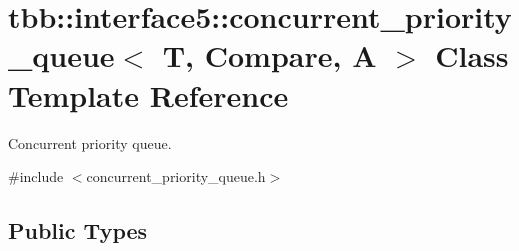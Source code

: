 \hypertarget{classtbb_1_1interface5_1_1concurrent__priority__queue}{}\section{tbb\+:\+:interface5\+:\+:concurrent\+\_\+priority\+\_\+queue$<$ T, Compare, A $>$ Class Template Reference}
\label{classtbb_1_1interface5_1_1concurrent__priority__queue}


Concurrent priority queue.  




{\ttfamily \#include $<$concurrent\+\_\+priority\+\_\+queue.\+h$>$}

\subsection*{Public Types}
